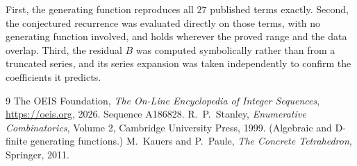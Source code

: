 \documentclass[11pt,a4paper]{article}
\theoremstyle{plain}
\theoremstyle{definition}
\begin{document}
First, the generating function reproduces all $27$ published terms exactly. Second,
the conjectured recurrence was evaluated directly on those terms, with no generating function
involved, and holds wherever the proved range and the data overlap. Third, the residual $B$ was
computed symbolically rather than from a truncated series, and its series expansion was taken
independently to confirm the coefficients it predicts.

\begin{thebibliography}{9}
 The OEIS Foundation, \emph{The On-Line Encyclopedia of Integer Sequences},
\url{https://oeis.org}, 2026. Sequence A186828.
 R.~P.~Stanley, \emph{Enumerative Combinatorics}, Volume 2, Cambridge
University Press, 1999. (Algebraic and D-finite generating functions.)
 M.~Kauers and P.~Paule, \emph{The Concrete Tetrahedron}, Springer, 2011.
\end{thebibliography}
\end{document}
